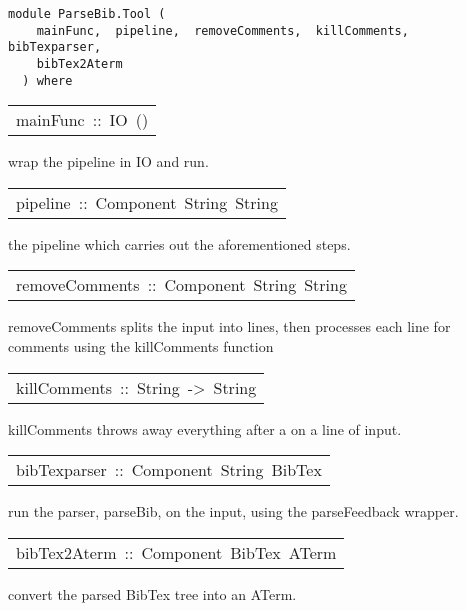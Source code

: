 \label{module:ParseBib.Tool}
\haddockbeginheader
{\haddockverb\begin{verbatim}
module ParseBib.Tool (
    mainFunc,  pipeline,  removeComments,  killComments,  bibTexparser, 
    bibTex2Aterm
  ) where\end{verbatim}}
\haddockendheader

\begin{haddockdesc}
\item[\begin{tabular}{@{}l}
mainFunc\ ::\ IO\ ()
\end{tabular}]\haddockbegindoc
wrap the pipeline in IO and run.
\par

\end{haddockdesc}
\begin{haddockdesc}
\item[\begin{tabular}{@{}l}
pipeline\ ::\ Component\ String\ String
\end{tabular}]\haddockbegindoc
the pipeline which carries out the aforementioned steps. 
\par

\end{haddockdesc}
\begin{haddockdesc}
\item[\begin{tabular}{@{}l}
removeComments\ ::\ Component\ String\ String
\end{tabular}]\haddockbegindoc
removeComments splits the input into lines, then processes each line
 for comments using the killComments function
\par

\end{haddockdesc}
\begin{haddockdesc}
\item[\begin{tabular}{@{}l}
killComments\ ::\ String\ ->\ String
\end{tabular}]\haddockbegindoc
killComments throws away everything after a  on a line of input.
\par

\end{haddockdesc}
\begin{haddockdesc}
\item[\begin{tabular}{@{}l}
bibTexparser\ ::\ Component\ String\ BibTex
\end{tabular}]\haddockbegindoc
run the parser, parseBib, on the input, using the parseFeedback wrapper.
\par

\end{haddockdesc}
\begin{haddockdesc}
\item[\begin{tabular}{@{}l}
bibTex2Aterm\ ::\ Component\ BibTex\ ATerm
\end{tabular}]\haddockbegindoc
convert the parsed BibTex tree into an ATerm.
\par

\end{haddockdesc}